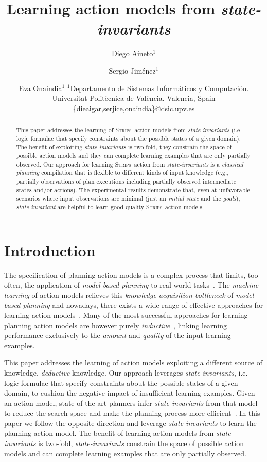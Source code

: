\documentclass{article}
\title{Learning action models from {\em state-invariants}}
\author{
Diego Aineto$^1$\and
Sergio Jim\'enez$^1$\and
Eva Onaindia$^1$
\affiliations
$^1${\small Departamento de Sistemas Inform\'aticos y Computaci\'on. Universitat Polit\`ecnica de Val\`encia. Valencia, Spain}
\emails
{\scriptsize \{dieaigar,serjice,onaindia\}@dsic.upv.es}}
\newcommand{\strips}{\textsc{Strips}}
\begin{document}
\maketitle


\begin{abstract}
This paper addresses the learning of \strips\ action models from {\em state-invariants} (i.e logic formulae that specify constraints about the possible states of a given domain). The benefit of exploiting {\em state-invariants} is two-fold, they constrain the space of possible action models and they can complete learning examples that are only partially observed. Our approach for learning \strips\ action from {\em state-invariants} is a {\em classical planning} compilation that is flexible to different kinds of input knowledge (e.g., partially observations of plan executions including partially observed intermediate states and/or actions). The experimental results demonstrate that, even at unfavorable scenarios where input observations are minimal (just an {\em initial state} and the {\em goals}), {\em state-invariant} are helpful to learn good quality \strips\ action models.
\end{abstract}

\section{Introduction}
\label{sec:introduction}

The specification of planning action models is a complex process that limits, too often, the application of {\em model-based planning} to real-world tasks~\cite{kambhampati:modellite:AAAI2007}. The {\em machine learning} of action models relieves this {\em knowledge acquisition bottleneck} of {\em model-based planning} and nowadays, there exists a wide range of effective approaches for learning action models~\cite{arora:amodels:ker2018}. Many of the most successful approaches for learning planning action models are however purely {\em inductive}~\cite{yang2007learning,pasula2007learning,mourao2010learning,zhuo2013action}, linking learning performance exclusively to the {\em amount} and {\em quality} of the input learning examples. 

This paper addresses the learning of action models exploiting a different source of knowledge, {\em deductive} knowledge. Our approach leverages {\em state-invariants}, i.e. logic formulae that specify constraints about the possible states of a given domain, to cushion the negative impact of insufficient learning examples. Given an action model, state-of-the-art planners infer {\em state-invariants} from that model to reduce the search space and make the planning process more efficient~\cite{helmert2009concise}. In this paper we follow the opposite direction and leverage {\em state-invariants} to learn the planning action model. The benefit of learning action models from {\em state-invariants} is two-fold, {\em state-invariants} constrain the space of possible action models and can complete learning examples that are only partially observed.
\end{document}
